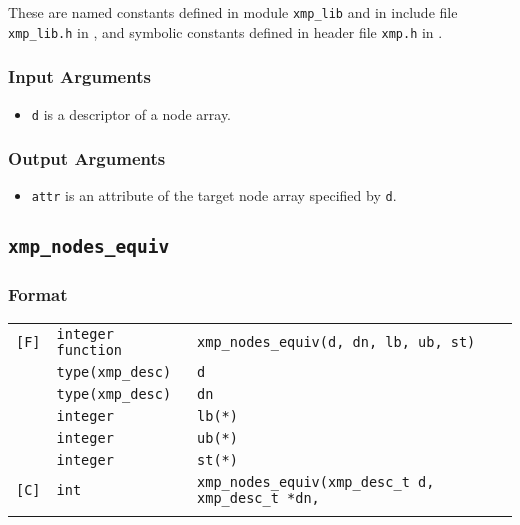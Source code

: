 These are named constants defined in module {\tt xmp\_lib} 
and in include file {\tt xmp\_lib.h} in {\XMPF}, and symbolic constants
defined in header file {\tt xmp.h} in {\XMPC}.

\subsubsection*{Input Arguments}
\begin{itemize}
 \item {\tt d} is a descriptor of a node array.
\end{itemize}

\subsubsection*{Output Arguments}
\begin{itemize}
 \item {\tt attr} is an attribute of the target node array specified by
       {\tt d}.
\end{itemize}


\subsection{\tt xmp\_nodes\_equiv}

\subsubsection*{Format}

\begin{tabular}{lll}

\verb![F]!& {\tt integer function}& {\tt xmp\_nodes\_equiv(d, dn, lb,  ub, st)}\\
          & {\tt type(xmp\_desc)} & {\tt d}\\
          & {\tt type(xmp\_desc)} & {\tt dn}\\
          & {\tt integer}         & {\tt lb(*)}\\
          & {\tt integer}         & {\tt ub(*)}\\
          & {\tt integer}         & {\tt st(*)}\\

\verb![C]!&  {\tt int}& {\tt xmp\_nodes\_equiv(xmp\_desc\_t d, xmp\_desc\_t *dn,}\\
          &           & \hspace{3.1cm}{\tt int lb[], int ub[], int st[])}\\

\end{tabular}

